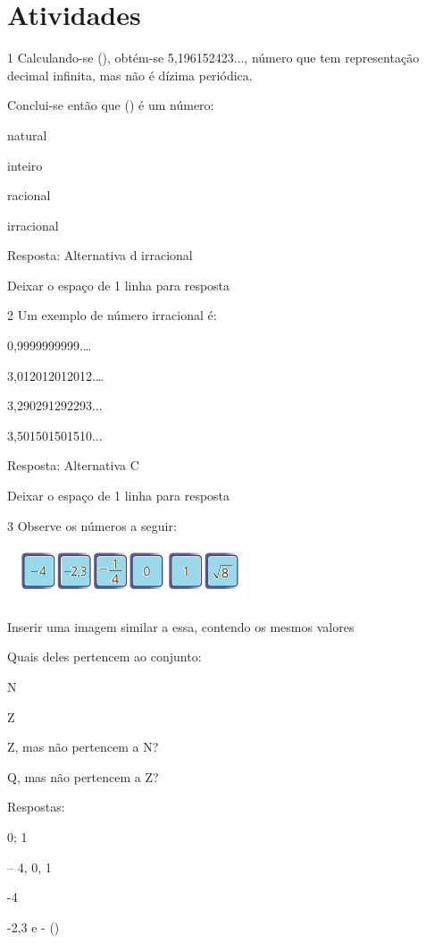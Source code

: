 \section{Atividades}

\num{1} Calculando-se (), obtém-se 5,196152423..., número que tem
representação decimal infinita, mas não é dízima periódica.

Conclui-se então que () é um número:

\item natural
\item inteiro
\item racional
\item irracional

Resposta: Alternativa d irracional

Deixar o espaço de 1 linha para resposta

\num{2} Um exemplo de número irracional é:

\item 0,9999999999.\ldots{}
\item 3,012012012012.\ldots{}
\item 3,290291292293...
\item 3,501501501510...

Resposta: Alternativa C

Deixar o espaço de 1 linha para resposta

\num{3} Observe os números a seguir:

\includegraphics[width=2\times 79167in,height=0\times 63542in]{./imgSAEB_8_MAT/media/image1.png}

Inserir uma imagem similar a essa, contendo os mesmos valores

Quais deles pertencem ao conjunto:

\item N
\item Z
\item Z, mas não pertencem a N?
\item Q, mas não pertencem a Z?

Respostas:

\item 0; 1
\item -- 4, 0, 1
\item -4
\item -2,3 e - ()


